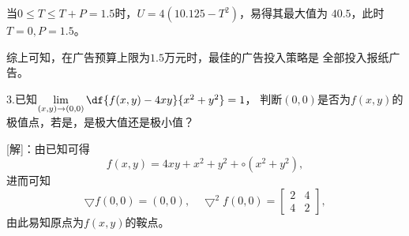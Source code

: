 当$0\leq T\leq T+P=1.5$时，$U=4(10.125-T^2)$，易得其最大值为
$40.5$，此时$T=0,P=1.5$。

综上可知，在广告预算上限为$1.5$万元时，最佳的广告投入策略是
全部投入报纸广告。\fin

\bs

3.已知$\lim\limits_{(x,y)\to(0,0)}\df{f(x,y)-4xy}{x^2+y^2}=1$，
判断$(0,0)$是否为$f(x,y)$的极值点，若是，是极大值还是极小值？

[解]：由已知可得
$$f(x,y)=4xy+x^2+y^2+\circ(x^2+y^2),$$
进而可知
$$\bigtriangledown f(0,0)=(0,0),\quad
\bigtriangledown^2f(0,0)=\left[\begin{array}{cc}
	2 & 4 \\ 4 & 2
\end{array}\right],$$
由此易知原点为$f(x,y)$的鞍点。\fin